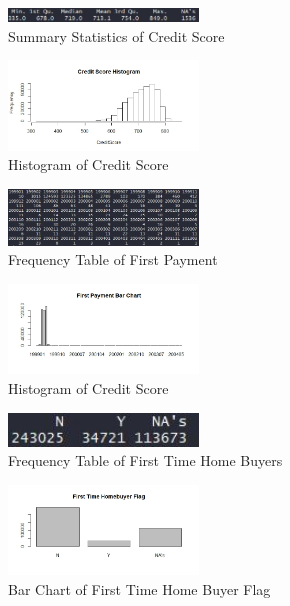 \documentclass[10pt,twocolumn,letterpaper]{article}
\begin{document}

\pagebreak

\begin{figure}
	\includegraphics[width=0.45\textwidth]{images/CreditScoreSummary.JPG}
	\caption{Summary Statistics of Credit Score}
	\label{fig:CreditScoreSummary}
\end{figure}
\begin{figure}
	\includegraphics[width=0.45\textwidth]{images/CreditScoreHist.jpeg}
	\caption{Histogram of Credit Score}
	\label{fig:CreditScoreHist}
\end{figure}

\begin{figure}
	\includegraphics[width=0.45\textwidth]{images/FirstPaymentSummary.JPG}
	\caption{Frequency Table of First Payment}
	\label{fig:FirstPaymentS}
\end{figure}
\begin{figure}
	\includegraphics[width=0.45\textwidth]{images/FirstPaymentBarChart.jpeg}
	\caption{Histogram of Credit Score}
	\label{fig:FirstPaymentB}
\end{figure}

\begin{figure}
	\includegraphics[width=0.45\textwidth]{images/FirstTimeHomeS.JPG}
	\caption{Frequency Table of First Time Home Buyers}
	\label{fig:FirstTimeHomeS}
\end{figure}
\begin{figure}
	\includegraphics[width=0.45\textwidth]{images/FirstTimeHomeB.jpeg}
	\caption{Bar Chart of First Time Home Buyer Flag}
	\label{fig:FirstTimeHomeB}
\end{figure}
\end{document}
